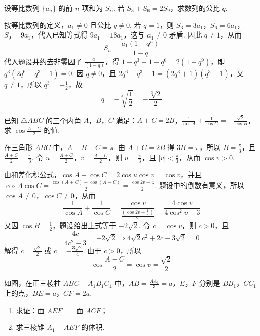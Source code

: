 \documentclass[UTF8,a4paper,oneside,11pt]{ctexbook}
\begin{document}
\begin{problem}
设等比数列 \(\{a_{n}\}\) 的前 \(n\) 项和为 \(S_{n}\). 若 \(S_{3} + S_{6} = 2S_{9}\)，求数列的公比 \(q\).
\end{problem}

\begin{solution}
按等比数列的定义，\(a_{1}\ne0\) 且公比 \(q\ne0\). 若 \(q=1\)，则 \(S_{3}=3a_{1}\)，\(S_{6}=6a_{1}\)，\(S_{9}=9a_{1}\)，代入已知等式得 \(9a_{1}=18a_{1}\)，这与 \(a_{1}\ne0\) 矛盾. 因此 \(q\ne1\)，从而
\[
S_n=\frac{a_1\left(1-q^n\right)}{1-q}
\]
代入题设并约去非零因子 \(\frac{a_1}{(1-q)}\)，得 \(1-q^3+1-q^6=2\left(1-q^9\right)\)，即 \(q^3\left(2q^6-q^3-1\right)=0\). 因 \(q\ne0\)，且 \(2q^6-q^3-1=\left(2q^3+1\right)\left(q^3-1\right)\)，又 \(q\ne1\)，所以 \(q^3=-\frac{1}{2}\)，故
\[
q=-\sqrt[3]{\frac{1}{2}}=-\frac{\sqrt[3]{2}}{2}
\]
\end{solution}

\begin{problem}
已知 \(\triangle ABC\) 的三个内角 \(A\)，\(B\)，\(C\) 满足：\(A + C = 2B\)，\(\frac{1}{\cos A} + \frac{1}{\cos C} = -\frac{\sqrt{2}}{\cos B}\)，求 \(\cos \frac{A - C}{2}\) 的值.
\end{problem}

\begin{solution}
在三角形 \(ABC\) 中，\(A+B+C=\pi\). 由 \(A+C=2B\) 得 \(3B=\pi\)，所以 \(B=\frac{\pi}{3}\)，且 \(\frac{A+C}{2}=\frac{\pi}{3}\). 令 \(u=\frac{A+C}{2}\)，\(v=\frac{A-C}{2}\)，则 \(u=\frac{\pi}{3}\)，且 \(|v|<\frac{\pi}{3}\)，从而 \(\cos v>0\).

由和差化积公式，\(\cos A+\cos C=2\cos u\cos v=\cos v\)，并且 \(\cos A\cos C=\frac{\cos(A+C)+\cos(A-C)}{2}=\frac{\cos 2v-\frac{1}{2}}{2}\). 题设中的倒数有意义，所以 \(\cos A\ne0\)，\(\cos C\ne0\)，从而
\[
\frac{1}{\cos A}+\frac{1}{\cos C}=\frac{\cos v}{\frac{\left(\cos 2v-\frac{1}{2}\right)}{2}}=\frac{4\cos v}{4\cos^2v-3}
\]
又因 \(\cos B=\frac{1}{2}\)，题设给出上式等于 \(-2\sqrt{2}\). 令 \(c=\cos v\)，则 \(c>0\)，且
\[
\frac{4c}{4c^2-3}=-2\sqrt{2}\Longrightarrow 4\sqrt{2}c^2+2c-3\sqrt{2}=0
\]
解得 \(c=\frac{\sqrt{2}}{2}\) 或 \(c=-\frac{3\sqrt{2}}{4}\). 由于 \(c>0\)，所以
\[
\cos\frac{A-C}{2}=\cos v=\frac{\sqrt{2}}{2}
\]
\end{solution}

\begin{problem}
如图，在正三棱柱 \(ABC - A_{1}B_{1}C_{1}\) 中，\(AB = \frac{AA_{1}}{3} = a\)，\(E\)，\(F\) 分别是 \(BB_{1}\)，\(CC_{1}\) 上的点，\(BE = a\)，\(CF = 2a\).

\begin{enumerate}
\item 求证：面 \(AEF\) \(\perp\) 面 \(ACF\)；
\item 求三棱锥 \(A_{1} - AEF\) 的体积.
\end{enumerate}

\end{problem}
\end{document}
